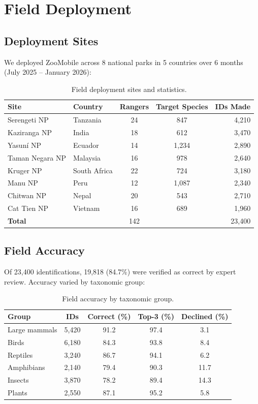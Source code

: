 \section{Field Deployment}

\label{sec:deployment}

\subsection{Deployment Sites}

We deployed ZooMobile across 8 national parks in 5 countries over 6 months (July 2025 -- January 2026):

\begin{table}[H]
\centering
\caption{Field deployment sites and statistics.}
\label{tab:deployment}
\begin{tabularx}{\textwidth}{@{}llccr@{}}
\toprule
\textbf{Site} & \textbf{Country} & \textbf{Rangers} & \textbf{Target Species} & \textbf{IDs Made} \\
\midrule
Serengeti NP & Tanzania & 24 & 847 & 4,210 \\
Kaziranga NP & India & 18 & 612 & 3,470 \\
Yasun\'{i} NP & Ecuador & 14 & 1,234 & 2,890 \\
Taman Negara NP & Malaysia & 16 & 978 & 2,640 \\
Kruger NP & South Africa & 22 & 724 & 3,180 \\
Manu NP & Peru & 12 & 1,087 & 2,340 \\
Chitwan NP & Nepal & 20 & 543 & 2,710 \\
Cat Tien NP & Vietnam & 16 & 689 & 1,960 \\
\midrule
\textbf{Total} & & 142 & & 23,400 \\
\bottomrule
\end{tabularx}
\end{table}

\subsection{Field Accuracy}

Of 23,400 identifications, 19,818 (84.7\%) were verified as correct by expert review.
Accuracy varied by taxonomic group:

\begin{table}[H]
\centering
\caption{Field accuracy by taxonomic group.}
\label{tab:field_accuracy}
\begin{tabular}{@{}lcccc@{}}
\toprule
\textbf{Group} & \textbf{IDs} & \textbf{Correct (\%)} & \textbf{Top-3 (\%)} & \textbf{Declined (\%)} \\
\midrule
Large mammals & 5,420 & 91.2 & 97.4 & 3.1 \\
Birds & 6,180 & 84.3 & 93.8 & 8.4 \\
Reptiles & 3,240 & 86.7 & 94.1 & 6.2 \\
Amphibians & 2,140 & 79.4 & 90.3 & 11.7 \\
Insects & 3,870 & 78.2 & 89.4 & 14.3 \\
Plants & 2,550 & 87.1 & 95.2 & 5.8 \\
\bottomrule
\end{tabular}
\end{table}

